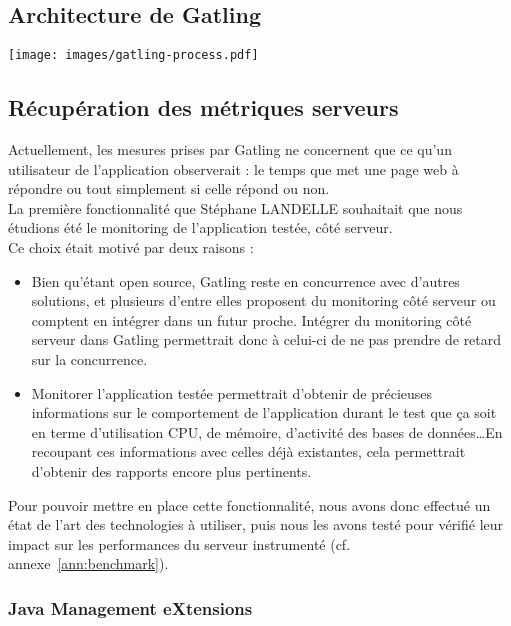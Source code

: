 \subsection{Architecture de Gatling}

\begin{center}
	\texttt{[image: images/gatling-process.pdf]}
\end{center}

\subsection{Récupération des métriques serveurs}

Actuellement, les mesures prises par Gatling ne concernent que ce qu'un utilisateur de l'application observerait : le temps que met une page web à répondre ou tout simplement si celle répond ou non.\\

La première fonctionnalité que Stéphane LANDELLE souhaitait que nous étudions été le monitoring de l'application testée, c\^oté serveur.\\

Ce choix était motivé par deux raisons :
\begin{itemize}
	\item Bien qu'étant open source, Gatling reste en concurrence avec d'autres solutions, et plusieurs d'entre elles proposent du monitoring c\^oté serveur ou comptent en intégrer dans un futur proche. Intégrer du monitoring c\^oté serveur  dans Gatling permettrait donc à celui-ci de ne pas prendre de retard sur la concurrence.
	\item Monitorer l'application testée permettrait d'obtenir de précieuses informations sur le comportement de l'application durant le test que ça soit en terme d'utilisation CPU, de mémoire, d'activité des bases de données\ldots En recoupant ces informations avec celles déjà existantes, cela permettrait d'obtenir des rapports encore plus pertinents.\\
\end{itemize}

Pour pouvoir mettre en place cette fonctionnalité, nous avons donc effectué un état de l'art des technologies à utiliser, puis nous les avons testé pour vérifié leur impact sur les performances du serveur instrumenté (cf. annexe~\ref{ann:benchmark}).\\

\subsubsection{Java Management eXtensions}


